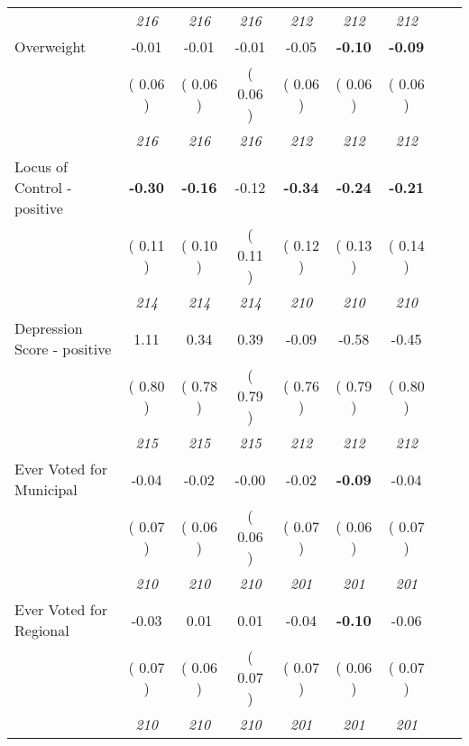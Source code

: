 \begin{tabular}{l c c c c c c c c}
& \textit{ 216 } & \textit{ 216 } & \textit{ 216 } & \textit{ 212 } & \textit{ 212 } & \textit{ 212 } \\
Overweight &     -0.01 &     -0.01 &     -0.01 &     -0.05 & \textbf{     -0.10 } & \textbf{     -0.09 } \\
& (     0.06 ) & (     0.06 ) & (     0.06 ) & (     0.06 ) & (     0.06 ) & (     0.06 ) \\
& \textit{ 216 } & \textit{ 216 } & \textit{ 216 } & \textit{ 212 } & \textit{ 212 } & \textit{ 212 } \\
Locus of Control - positive & \textbf{     -0.30 } & \textbf{     -0.16 } &     -0.12 & \textbf{     -0.34 } & \textbf{     -0.24 } & \textbf{     -0.21 } \\
& (     0.11 ) & (     0.10 ) & (     0.11 ) & (     0.12 ) & (     0.13 ) & (     0.14 ) \\
& \textit{ 214 } & \textit{ 214 } & \textit{ 214 } & \textit{ 210 } & \textit{ 210 } & \textit{ 210 } \\
Depression Score - positive &      1.11 &      0.34 &      0.39 &     -0.09 &     -0.58 &     -0.45 \\
& (     0.80 ) & (     0.78 ) & (     0.79 ) & (     0.76 ) & (     0.79 ) & (     0.80 ) \\
& \textit{ 215 } & \textit{ 215 } & \textit{ 215 } & \textit{ 212 } & \textit{ 212 } & \textit{ 212 } \\
Ever Voted for Municipal &     -0.04 &     -0.02 &     -0.00 &     -0.02 & \textbf{     -0.09 } &     -0.04 \\
& (     0.07 ) & (     0.06 ) & (     0.06 ) & (     0.07 ) & (     0.06 ) & (     0.07 ) \\
& \textit{ 210 } & \textit{ 210 } & \textit{ 210 } & \textit{ 201 } & \textit{ 201 } & \textit{ 201 } \\
Ever Voted for Regional &     -0.03 &      0.01 &      0.01 &     -0.04 & \textbf{     -0.10 } &     -0.06 \\
& (     0.07 ) & (     0.06 ) & (     0.07 ) & (     0.07 ) & (     0.06 ) & (     0.07 ) \\
& \textit{ 210 } & \textit{ 210 } & \textit{ 210 } & \textit{ 201 } & \textit{ 201 } & \textit{ 201 } \\
\bottomrule
\end{tabular}
